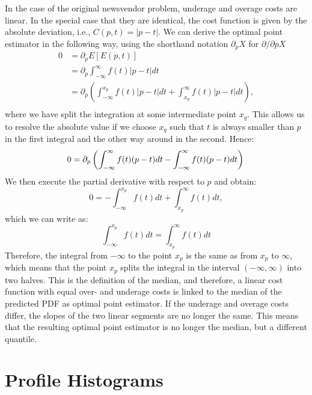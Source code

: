 \documentclass[BCOR=1mm, DIV=calc,10pt,
twoside=true,
twocolumn,
headings=normal]{scrartcl}
\begin{document}
In the case of the original newsvendor problem, underage and overage costs are linear. In the special case that they are identical, the cost function is given by the absolute deviation, i.e., $C(p,t) = |p-t|$.
We can derive the optimal point estimator in the following way, using the shorthand notation $\partial_p X$ for $\partial/\partial p X$
\begin{align*}
0 &= \partial_p E[E(p,t)]  \\
&= \partial_p \int_{-\infty}^\infty f(t) |p-t| dt \\
&= \partial_p \left ( \int_{-\infty}^{x_p} f(t) |p-t| dt +  \int_{x_p}^\infty f(t) |p-t| dt \right ), \\
\end{align*}
where we have split the integration at some intermediate point $x_q$. This allows us to resolve the absolute value if we choose $x_q$ such that $t$ is always smaller than $p$ in the first integral and the other way around in the second. Hence:
\begin{equation}
0 = \partial_p \left ( \int_{-\infty}^\infty f(t) (p-t) dt -  \int_{-\infty}^\infty f(t) (p-t) dt \right ) \\
\end{equation}
We then execute the partial derivative with respect to $p$ and obtain:
\begin{equation}
0 = -  \int_{-\infty}^{x_p} f(t) dt + \int_{x_p}^\infty f(t)  dt,
\end{equation}
which we can write as:
\begin{equation}
 \int_{-\infty}^{x_p} f(t) dt = \int_{x_p}^\infty f(t)  dt
\end{equation}
Therefore, the integral from $-\infty$ to the point $x_p$ is the same as from $x_p$ to $\infty$, which means that the point $x_p$ splits the integral in the interval $(-\infty, \infty)$ into two halves. This is the definition of the median, and therefore, a linear cost function with equal over- and underage costs is linked to the median of the predicted PDF as optimal point estimator. If the underage and overage costs differ, the slopes of the two linear segments are no longer the same. This means that the resulting optimal point estimator is no longer the median, but a different quantile. 

\section{Profile Histograms}
\label{sec:profile}
\end{document}
